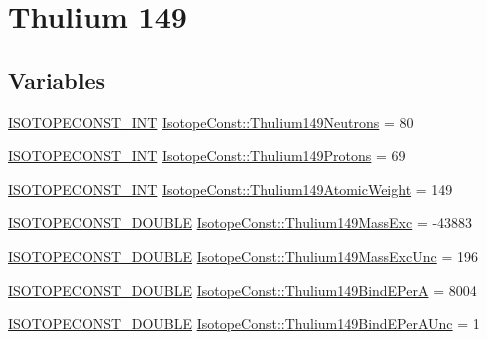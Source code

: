 \hypertarget{group___isotope_const-_thulium-_tm149}{}\section{Thulium 149}
\label{group___isotope_const-_thulium-_tm149}
\subsection*{Variables}
\begin{DoxyCompactItemize}
\item 
\mbox{\hyperlink{group___isotope_const-_macros_ga5f18360b3e99483a35c32d789e62621c}{I\+S\+O\+T\+O\+P\+E\+C\+O\+N\+S\+T\+\_\+\+I\+NT}} \mbox{\hyperlink{group___isotope_const-_thulium-_tm149_ga099d5e2ef2988f795fbaec38fca88e5f}{Isotope\+Const\+::\+Thulium149\+Neutrons}} = 80
\item 
\mbox{\hyperlink{group___isotope_const-_macros_ga5f18360b3e99483a35c32d789e62621c}{I\+S\+O\+T\+O\+P\+E\+C\+O\+N\+S\+T\+\_\+\+I\+NT}} \mbox{\hyperlink{group___isotope_const-_thulium-_tm149_gadd4560893c34e9ddab8895f0b1ef7210}{Isotope\+Const\+::\+Thulium149\+Protons}} = 69
\item 
\mbox{\hyperlink{group___isotope_const-_macros_ga5f18360b3e99483a35c32d789e62621c}{I\+S\+O\+T\+O\+P\+E\+C\+O\+N\+S\+T\+\_\+\+I\+NT}} \mbox{\hyperlink{group___isotope_const-_thulium-_tm149_gac28e59b6de782e7e8075d02c569904c7}{Isotope\+Const\+::\+Thulium149\+Atomic\+Weight}} = 149
\item 
\mbox{\hyperlink{group___isotope_const-_macros_ga8f45a7272ce02c0b4c65c44636ed719a}{I\+S\+O\+T\+O\+P\+E\+C\+O\+N\+S\+T\+\_\+\+D\+O\+U\+B\+LE}} \mbox{\hyperlink{group___isotope_const-_thulium-_tm149_ga783d729cfa2388b03ec31eb4f91a7000}{Isotope\+Const\+::\+Thulium149\+Mass\+Exc}} = -\/43883
\item 
\mbox{\hyperlink{group___isotope_const-_macros_ga8f45a7272ce02c0b4c65c44636ed719a}{I\+S\+O\+T\+O\+P\+E\+C\+O\+N\+S\+T\+\_\+\+D\+O\+U\+B\+LE}} \mbox{\hyperlink{group___isotope_const-_thulium-_tm149_gaffd9a5595dbc2bd9b52839a6ec879d2f}{Isotope\+Const\+::\+Thulium149\+Mass\+Exc\+Unc}} = 196
\item 
\mbox{\hyperlink{group___isotope_const-_macros_ga8f45a7272ce02c0b4c65c44636ed719a}{I\+S\+O\+T\+O\+P\+E\+C\+O\+N\+S\+T\+\_\+\+D\+O\+U\+B\+LE}} \mbox{\hyperlink{group___isotope_const-_thulium-_tm149_gaa06614a6b189eb1263469caeac39f6a5}{Isotope\+Const\+::\+Thulium149\+Bind\+E\+PerA}} = 8004
\item 
\mbox{\hyperlink{group___isotope_const-_macros_ga8f45a7272ce02c0b4c65c44636ed719a}{I\+S\+O\+T\+O\+P\+E\+C\+O\+N\+S\+T\+\_\+\+D\+O\+U\+B\+LE}} \mbox{\hyperlink{group___isotope_const-_thulium-_tm149_ga6db5c0bf2bf78813745f62787f905097}{Isotope\+Const\+::\+Thulium149\+Bind\+E\+Per\+A\+Unc}} = 1

\end{DoxyCompactItemize}
